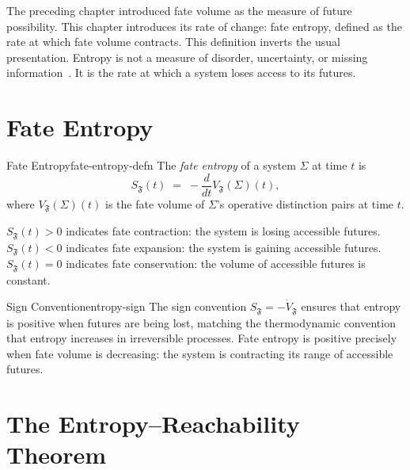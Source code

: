 \documentclass[12pt,twoside,openright]{book}
\newcommand{\fateMap}{\mathfrak{F}}
\providecommand{\fateVol}[1]{V_{\fateMap}(#1)}
\providecommand{\fateEnt}{S_{\fateMap}}
\begin{document}
The preceding chapter introduced fate volume as the measure of
future possibility. This chapter introduces its rate of change:
fate entropy, defined as the rate at which fate volume
contracts. This definition inverts the usual presentation.
Entropy is not a measure of disorder, uncertainty, or missing
information~\cite{shannon1948}. It is the rate at which a system loses access to
its futures.

\section{Fate Entropy}

\begin{definition}{Fate Entropy}{fate-entropy-defn}
The \emph{fate entropy} of a system $\Sigma$ at time $t$ is
\[
  \fateEnt(t)
  \;=\;
  -\frac{d}{dt}\fateVol{\Sigma}(t),
\]
where $\fateVol{\Sigma}(t)$ is the fate volume of $\Sigma$'s
operative distinction pairs at time $t$.

$\fateEnt(t)>0$ indicates fate contraction: the system is
losing accessible futures. $\fateEnt(t)<0$ indicates fate
expansion: the system is gaining accessible futures.
$\fateEnt(t)=0$ indicates fate conservation: the volume of
accessible futures is constant.
\end{definition}

\begin{remark}{Sign Convention}{entropy-sign}
The sign convention $\fateEnt=-\dot{V}_{\fateMap}$ ensures
that entropy is positive when futures are being lost, matching
the thermodynamic convention that entropy increases in
irreversible processes. Fate entropy is positive precisely
when fate volume is decreasing: the system is contracting its
range of accessible futures.
\end{remark}

\section{The Entropy--Reachability Theorem}
\end{document}
